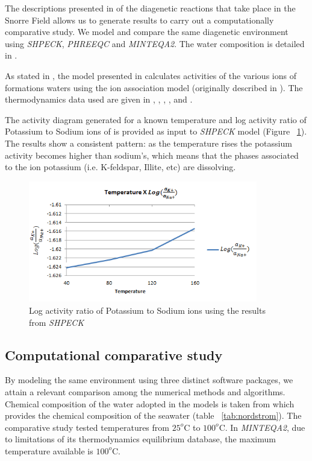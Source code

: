 \documentclass[preprint,12pt,3p]{elsarticle}
\begin{document}
The descriptions presented in \cite{Morad:90} of the diagenetic reactions that take place in the Snorre Field allows us to generate results to carry out a computationally comparative study. We model and compare the same diagenetic environment using \emph{SHPECK}, \emph{PHREEQC} and \emph{MINTEQA2}. The water composition is detailed in \cite{Nordstrom:79}.

As stated in \cite{Morad:90}, the model presented in \cite{Egeberg:88} calculates activities of the various ions of formations waters using the ion association model (originally described in \cite{Wigley:77}). 
The thermodynamics data used are given in \cite{Helgeson:74a},  \cite{Helgeson:74b}, \cite{Helgeson:76}, \cite{Waltter:77}, \cite{Helgeson:78} and \cite{Helgeson:81}.

The activity diagram generated for a known temperature and log activity ratio of Potassium to Sodium ions of \cite{Aagaard:90} is provided as input to \emph{SHPECK} model (Figure ~\ref{fig:tempXactratio}). The results show a consistent pattern: as the temperature rises the potassium activity becomes higher than sodium’s, which means that the phases associated to the ion potassium (i.e. K-feldspar, Illite, etc) are dissolving.


\begin{figure}[ht!]
\centering
\includegraphics[width=100mm]{tempXactratio.png}
\caption{Log activity ratio of Potassium to Sodium ions using the results from \emph{SHPECK}}
\label{fig:tempXactratio}
\end{figure}

\subsection{Computational comparative study} 
By modeling the same environment using three distinct software packages, we attain a relevant comparison among the numerical methods and algorithms.
Chemical composition of the water adopted in the models is taken from  \cite{Nordstrom:79} which provides the chemical composition of the seawater (table ~\ref{tab:nordstrom}). The comparative study tested temperatures from $25^o$C to $100^o$C. In \emph{MINTEQA2}, due to limitations of its thermodynamics equilibrium database, the maximum temperature available is $100^o$C.
\end{document}
